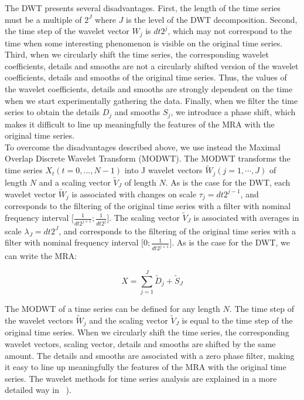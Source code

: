 \documentclass{article}
\begin{document}
The DWT presents several disadvantages. First, the length of the time series must be a multiple of $2^J$ where $J$ is the level of the DWT decomposition. Second, the time step of the wavelet vector $W_j$ is $dt 2^j$, which may not correspond to the time when some interesting phenomenon is visible on the original time series. Third, when we circularly shift the time series, the corresponding wavelet coefficients, details and smooths are not a circularly shifted version of the wavelet coefficients, details and smooths of the original time series. Thus, the values of the wavelet coefficients, details and smooths are strongly dependent on the time when we start experimentally gathering the data. Finally, when we filter the time series to obtain the details $D_j$ and smooths $S_j$, we introduce a phase shift, which makes it difficult to line up meaningfully the features of the MRA with the original time series. \\

To overcome the disadvantages described above, we use instead the Maximal Overlap Discrete Wavelet Transform (MODWT). The MODWT transforms the time series $X_t \left( t = 0, ... , N - 1 \right)$ into J wavelet vectors $\widetilde{W}_j \left( j = 1 ,  \cdots , J \right)$ of length $N$ and a scaling vector $\widetilde{V}_J$ of length $N$. As is the case for the DWT, each wavelet vector $\widetilde{W}_j$ is associated with changes on scale $\tau_j = dt 2^{j - 1}$, and corresponds to the filtering of the original time series with a filter with nominal frequency interval $\lbrack \frac{1}{dt 2^{j + 1}} ; \frac{1}{dt 2^j} \rbrack$. The scaling vector $\widetilde{V}_J$ is associated with averages in scale $\lambda_J = dt 2^J$, and corresponds to the filtering of the original time series with a filter with nominal frequency interval $\lbrack 0 ; \frac{1}{dt 2^{j + 1}} \rbrack$. As is the case for the DWT, we can write the MRA:

\begin{linenomath*}
\begin{equation}
X = \sum_{j = 1}^{J} \widetilde{D}_j + \widetilde{S}_J
\end{equation}
\end{linenomath*}

The MODWT of a time series can be defined for any length $N$. The time step of the wavelet vectors $\widetilde{W}_j$ and the scaling vector $\widetilde{V}_J$ is equal to the time step of the original time series. When we circularly shift the time series, the corresponding wavelet vectors, scaling vector, details and smooths are shifted by the same amount. The details and smooths are associated with a zero phase filter, making it easy to line up meaningfully the features of the MRA with the original time series. The wavelet methods for time series analysis are explained in a more detailed way in ~\citep{PER_2000}). \\
\end{document}
